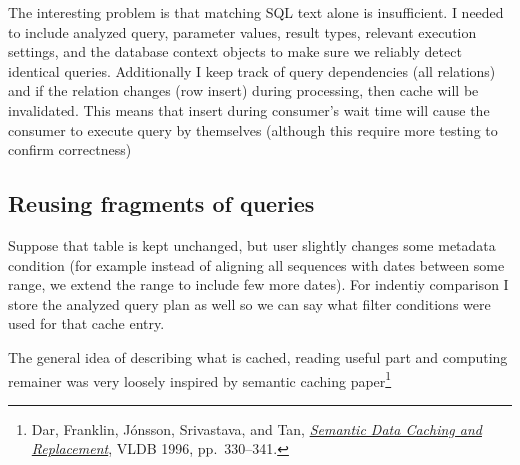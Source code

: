 The interesting problem is that matching SQL text alone is insufficient. I needed to include
analyzed query, parameter values, result types, relevant execution settings,
and the database context objects to make sure we reliably detect identical queries.
Additionally I keep track of query dependencies (all relations) and if the relation changes (row insert) during processing, then cache will be invalidated.
This means that insert during consumer's wait time will cause the consumer to execute query by themselves (although this require more testing to confirm correctness)

\subsection{Reusing fragments of queries}
\label{sec:seq-results-cache}

Suppose that table is kept unchanged, but user slightly changes some metadata condition (for example instead of aligning all sequences with dates between some range, we extend the range to include few more dates).
For indentiy comparison I store the analyzed query plan as well so we can say what filter conditions were used for that cache entry. 

The general idea of describing what is cached, reading useful part and computing remainer was very loosely inspired by semantic caching paper\footnote{Dar, Franklin, J\'onsson,
Srivastava, and Tan, \href{https://www.vldb.org/conf/1996/P330.PDF}
{\emph{Semantic Data Caching and Replacement}}, VLDB 1996, pp.~330--341.}

